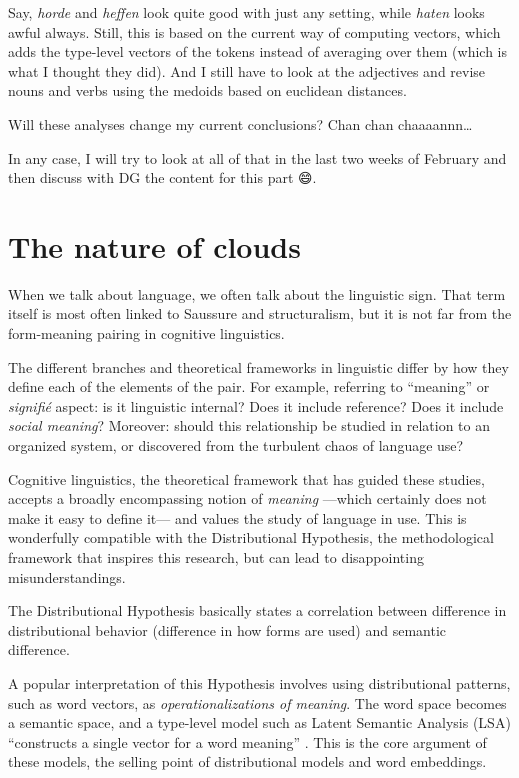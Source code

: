 \documentclass[
]{book}
\begin{document}
Say, \emph{horde} and \emph{heffen} look quite good with just any setting, while \emph{haten} looks awful always.
Still, this is based on the current way of computing vectors,
which adds the type-level vectors of the tokens instead of averaging over them
(which is what I thought they did).
And I still have to look at the adjectives and revise nouns and verbs using the medoids based on
euclidean distances.

Will these analyses change my current conclusions? Chan chan chaaaannn\ldots{}

In any case, I will try to look at all of that in the last two weeks of February and then
discuss with DG the content for this part 😄.

\hypertarget{the-nature-of-clouds}{%
\chapter{The nature of clouds}\label{the-nature-of-clouds}}

When we talk about language, we often talk about the linguistic sign. That term itself
is most often linked to Saussure
and structuralism, but it is not far from the form-meaning pairing in cognitive linguistics.

The different branches and theoretical frameworks in linguistic differ by how they
define each of the elements of the pair. For example, referring to ``meaning'' or \emph{signifié}
aspect: is it linguistic internal? Does it include reference? Does it include \emph{social meaning}?
Moreover: should this relationship be studied in relation to an organized system,
or discovered from the turbulent chaos of language use?

Cognitive linguistics, the theoretical framework that has guided these studies, accepts
a broadly encompassing notion of \emph{meaning} ---which certainly does not make it easy to
define it--- and values the study of language in use. This is wonderfully compatible with
the Distributional Hypothesis, the methodological framework that inspires this research,
but can lead to disappointing misunderstandings.

The Distributional Hypothesis basically states a correlation between difference in
distributional behavior (difference in how forms are used) and semantic difference.

A popular interpretation of this Hypothesis involves using distributional patterns,
such as word vectors, as \emph{operationalizations of meaning}. The word space becomes a
semantic space, and a type-level model such as Latent Semantic Analysis (LSA)
``constructs a single vector for a word meaning'' \autocite[ 82]{bolognesi_2020}. This is the core
argument of these models, the selling point of distributional models and word embeddings.
\end{document}
